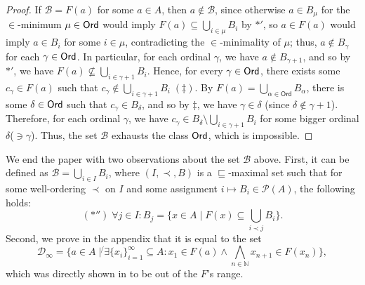 \documentclass[12pt]{article}
\begin{document}
\begin{proof}

\noindent
If $\mathcal{B}=F(a)$ for some $a\in A$, then $a\not\in\mathcal{B}$, since otherwise $a\in B_\mu$ for the $\in$-minimum $\mu\in{\sf Ord}$ would imply  $F(a)\subseteq\bigcup_{i\in\mu}B_i$   by $\boldsymbol\ast'$,   so $a\in F(a)$ would imply $a\in B_i$ for some $i\in\mu$, contradicting the $\in$-minimality  of $\mu$; thus, $a\not\in B_\gamma$ for each $\gamma\in{\sf Ord}$. In particular, for each ordinal $\gamma$, we have $a\not\in B_{\gamma+1}$, and so by  $\boldsymbol\ast'$, we have $F(a)\not\subseteq\bigcup_{i\in\gamma+1}B_i$. Hence, for every $\gamma\in{\sf Ord}$, there exists some $c_\gamma\in F(a)$ such that $c_\gamma\not\in\bigcup_{i\in\gamma+1}B_i\;(\ddag)$. By $F(a)=\bigcup_{\alpha\in\textsf{Ord}}B_\alpha$, there is some $\delta\in{\sf Ord}$ such that $c_\gamma\in B_\delta$, and so by $\ddag$, we have $\gamma\in\delta$ (since $\delta\not\in\gamma+1$). Therefore, for each ordinal $\gamma$, we have  $c_\gamma\in B_\delta\setminus\bigcup_{i\in\gamma+1}B_i$ for some bigger ordinal $\delta$($\ni\gamma$). Thus, the set $\mathcal{B}$ exhausts the class ${\sf Ord}$, which is impossible.
\end{proof}



We end the paper with two observations about the set $\mathcal{B}$ above. First, it can be defined as $\mathcal{B}=\bigcup_{i\in I}B_i$, where $(I,\prec,B)$ is a $\sqsubseteq$-maximal set such that for some well-ordering $\prec$ on $I$ and some assignment $i\mapsto B_i\in\mathscr{P}(A)$, the following holds:  $$(\boldsymbol\ast'')\;\forall j\in I: B_j=\{x\in A\mid F(x)\subseteq\bigcup_{i\prec j}B_i\}.$$
Second, we prove in the appendix that it is equal to the set $$\mathcal{D}_{\infty}=\{a\in A\mid \boldsymbol\not\!\exists
\{x_i\}_{i=1}^{\infty}\subseteq A\!\!: x_1\in F(a)\wedge\bigwedge_{n\in\mathbb{N}}x_{n+1}\in F(x_n)\},$$
which was directly shown in \textbf{\cite{R05}} to be out of the $F$'s range.
\end{document}
